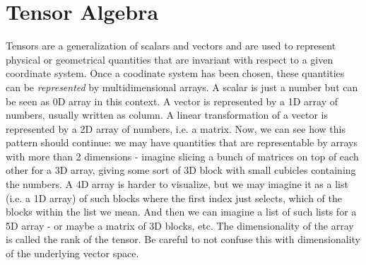 \section{Tensor Algebra}
Tensors are a generalization of scalars and vectors and are used to represent physical or geometrical quantities that are invariant with respect to a given coordinate system. Once a coodinate system has been chosen, these quantities can be \emph{represented} by multidimensional arrays. A scalar is just a number but can be seen as 0D array in this context. A vector is represented by a 1D array of numbers, usually written as column. A linear transformation of a vector is represented by a 2D array of numbers, i.e. a matrix. Now, we can see how this pattern should continue: we may have quantities that are representable by arrays with more than 2 dimensions - imagine slicing a bunch of matrices on top of each other for a 3D array, giving some sort of 3D block with small cubicles containing the numbers. A 4D array is harder to visualize, but we may imagine it as a list (i.e. a 1D array) of such blocks where the first index just selects, which of the blocks within the list we mean. And then we can imagine a list of such lists for a 5D array - or maybe a matrix of 3D blocks, etc. The dimensionality of the array is called the rank of the tensor. Be careful to not confuse this with dimensionality of the underlying vector space.





